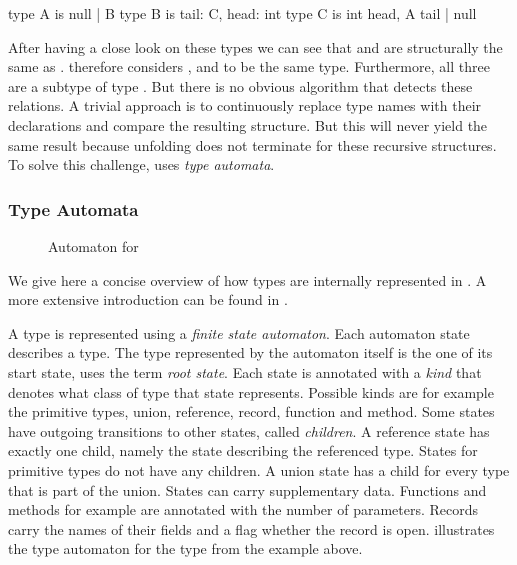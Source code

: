 \begin{whileycode}
type A is null | B
type B is {tail: C, head: int}
type C is {int head, A tail} | null
\end{whileycode}

After having a close look on these types we can see that  and  are structurally the same as .
\whiley therefore considers ,  and  to be the same type.
Furthermore, all three are a subtype of type .
But there is no obvious algorithm that detects these relations.
A trivial approach is to continuously replace type names with their declarations and compare the resulting structure.
But this will never yield the same result because unfolding does not terminate for these recursive structures.
To solve this challenge, \whiley uses \emph{type automata}.


\subsubsection{Type Automata}\label{section:background-whiley-type-automata}

\begin{wrapfigure}{O}{0.42\linewidth}

\caption{Automaton for }
\label{figure:automaton-linkedlist}
\end{wrapfigure}

We give here a concise overview of how types are internally represented in \whiley.
A more extensive introduction can be found in \cite{WYAUTL, pearce2011algorithmic}.

A type is represented using a \emph{finite state automaton}.
Each automaton state describes a type.
The type represented by the automaton itself is the one of its start state, \whiley uses the term \emph{root state}.
Each state is annotated with a \emph{kind} that denotes what class of type that state represents.
Possible kinds are for example the primitive types, union, reference, record, function and method.
Some states have outgoing transitions to other states, called \emph{children}.
A reference state has exactly one child, namely the state describing the referenced type.
States for primitive types do not have any children.
A union state has a child for every type that is part of the union.
States can carry supplementary data.
Functions and methods for example are annotated with the number of parameters.
Records carry the names of their fields and a flag whether the record is open.
 illustrates the type automaton for the type  from the example above.

